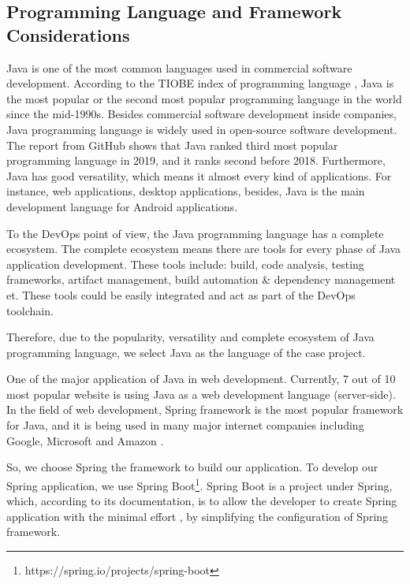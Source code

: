 \subsection{Programming Language and Framework Considerations}
Java is one of the most common languages used in commercial software development. According to the TIOBE index of programming language \cite{indexTIO42:online}, Java is the most popular or the second most popular programming language in the world since the mid-1990s. Besides commercial software development inside companies, Java programming language is widely used in open-source software development. The report \cite{TheState3:online} from GitHub shows that Java ranked third most popular programming language in 2019, and it ranks second before 2018. Furthermore, Java has good versatility, which means it almost every kind of applications. For instance, web applications, desktop applications, besides, Java is the main development language for Android applications.
\par
To the DevOps point of view, the Java programming language has a complete ecosystem. The complete ecosystem means there are tools for every phase of Java application development. These tools include: build, code analysis, testing frameworks, artifact management, build automation \& dependency management et. These tools could be easily integrated and act as part of the DevOps toolchain.
\par
Therefore, due to the popularity, versatility and complete ecosystem of Java programming language, we select Java as the language of the case project.
\par
One of the major application of Java in web development. Currently, 7 out of 10 \cite{Programm17:online} most popular website is using Java as a web development language (server-side). In the field of web development, Spring framework is the most popular framework for Java, and it is being used in many major internet companies including Google, Microsoft and Amazon \cite{SpringWh14:online}.
\par
So, we choose Spring the framework to build our application. To develop our Spring application, we use Spring Boot\footnote{https://spring.io/projects/spring-boot}. Spring Boot is a project under Spring, which, according to its documentation, is to allow the developer to create Spring application with the minimal effort \cite{SpringBo84:online}, by simplifying the configuration of Spring framework.
